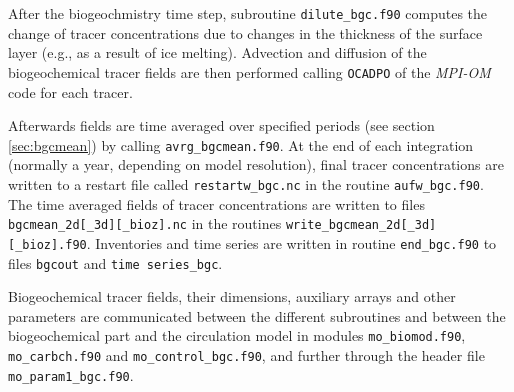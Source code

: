 \documentclass[11pt,a4paper,fleqn,twoside]{article}
\begin{document}
After the biogeochmistry time step, subroutine {\tt dilute\_bgc.f90} computes the change 
of tracer concentrations due to 
changes in the thickness of the surface layer (e.g.,  as a result of ice melting). 
Advection and diffusion of the biogeochemical tracer fields are then performed
calling {\tt OCADPO} of the {\em MPI-OM} code for each tracer. 

Afterwards fields are time averaged over specified
periods (see section \ref{sec:bgcmean}) by calling {\tt avrg\_bgcmean.f90}. 
At the end of each integration (normally a year, depending on model resolution), final tracer concentrations 
are written to a restart file called {\tt restartw\_bgc.nc} in the routine {\tt aufw\_bgc.f90}. 
The time averaged
fields of tracer concentrations are written to files {\tt bgcmean\_2d[\_3d][\_bioz].nc} in the
routines {\tt write\_bgcmean\_2d[\_3d][\_bioz].f90}. Inventories and time series are written
in routine {\tt end\_bgc.f90} to files {\tt bgcout} and {\tt time series\_bgc}. 

Biogeochemical tracer fields, their dimensions, auxiliary
arrays and other parameters are communicated between the different subroutines
and between the biogeochemical part and the circulation model in modules
{\tt mo\_biomod.f90}, {\tt mo\_carbch.f90} and {\tt mo\_control\_bgc.f90},
and further through the header file {\tt mo\_param1\_bgc.f90}.
\end{document}

